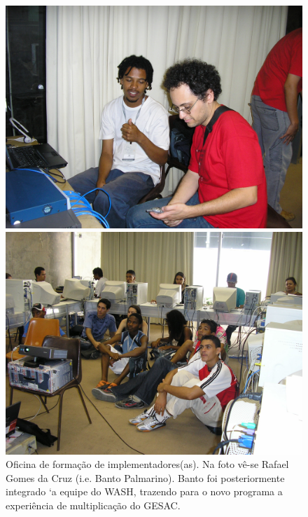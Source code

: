 \documentclass[
12pt,		%
openright,	%
twoside,  %
a4paper,			%
chapter=TITLE,		%
english,			%
french,				%
spanish,			%
brazil				%
]{USPSC-classe/USPSC}
\begin{document}
\captionsetup{format=plain}
\begin{figure}[max size={\textwidth}{\textheight}]

\centering


\begin{minipage}[b]{0.4\linewidth}
        \centering
                \includegraphics[width=1.0\linewidth]{../../imagens/bantorafa.JPG}
                \caption{Oficina de forma\c{c}\~ao de implementadores(as). Na foto v\^e-se Rafael Gomes da Cruz (i.e. Banto Palmarino). Banto foi posteriormente integrado `a equipe do WASH, trazendo para o novo programa a experi\^encia de multiplica\c{c}\~ao do GESAC.}
                \label{d2d74ac61c1b95a746858e8420d24348e1b48f51}
\end{minipage}%
\hspace{0.5cm}
\begin{minipage}[b]{0.4\linewidth}
        \centering
                \includegraphics[width=1.0\linewidth]{../../imagens/oficinalac.JPG}

\end{minipage}
\end{figure}
\end{document}
